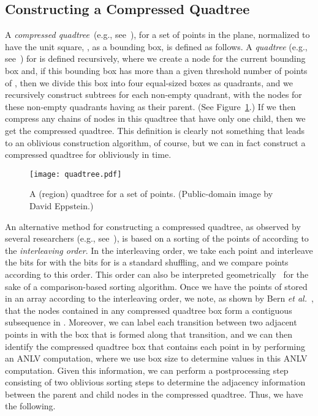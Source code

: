 \documentclass[11pt]{article}
\begin{document}
{\subsection{Constructing a Compressed Quadtree}
A \emph{compressed quadtree}~(e.g., 
see~\cite{bet-pcqqt-99,c-wspdl-08,s-sdsqo-89}), 
for a set  of  points in the
plane, normalized to have the unit square, ,
as a bounding box, is
defined as follows.
A \emph{quadtree} (e.g., see~\cite{s-sdsqo-89}) 
for 
is defined recursively, where we create a node  for the 
current bounding box and, if this bounding box has more than a given
threshold number of points of , 
then we divide this box into four equal-sized boxes 
as quadrants, and we recursively construct subtrees for each non-empty quadrant,
with the nodes for these non-empty quadrants having  as their parent.
(See Figure~\ref{fig:quadtree}.)
If we then compress any chains of nodes in this quadtree
that have only one child, then we get the compressed quadtree.
This definition is clearly not something that leads to an oblivious
construction algorithm, of course, but we can in fact
construct a compressed quadtree for  obliviously in  time.

\begin{figure}[hbt]
\centering\texttt{[image: quadtree.pdf]}
\caption{\label{fig:quadtree} A (region) quadtree for a set of points.
(Public-domain image by David Eppstein.)}
\end{figure}

An alternative method for constructing a compressed quadtree, as
observed by several researchers (e.g.,
see~\cite{bet-pcqqt-99,c-wspdl-08,s-sdsqo-89}), 
is based on a sorting of the points of  according to the 
\emph{interleaving order}.
In the interleaving order, we take each point  and interleave the bits
for  with the bits for  is a standard shuffling, and we compare points
according to this order. This order can also be interpreted
geometrically~\cite{c-wspdl-08} for the sake of a comparison-based sorting
algorithm.
Once we have the points of  stored in an array  according to the
interleaving order, we note, as shown by 
Bern {\it et al.}~\cite{bet-pcqqt-99}, that the nodes
contained in any compressed quadtree box 
form a contiguous subsequence in .
Moreover, we can label each transition between two adjacent points in 
with the box that is formed along that transition, and we can then identify
the compressed quadtree box that contains each point  in  by performing
an ANLV computation, where we use box size to determine values in
this ANLV computation.
Given this information, we can perform a postprocessing 
step consisting of two oblivious sorting
steps to determine the adjacency information between the parent and child
nodes in the compressed quadtree.
Thus, we have the following.

}
\end{document}
